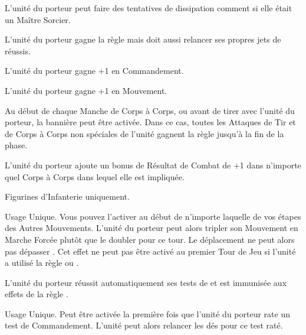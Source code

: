 L'unité du porteur peut faire des tentatives de dissipation comment si elle était un Maître Sorcier.

L'unité du porteur gagne la règle \divineattacks{} mais doit aussi relancer ses propres jets de \wardsave{} réussis.

L'unité du porteur gagne +1 en Commandement.

L'unité du porteur gagne +1 en Mouvement.

Au début de chaque Manche de Corps à Corps, ou avant de tirer avec l'unité du porteur, la bannière peut être activée. Dans ce cas, toutes les Attaques de Tir et de Corps à Corps non spéciales de l'unité gagnent la règle \flamingattacks{} jusqu'à la fin de la phase.

\columnbreak

L'unité du porteur ajoute un bonus de Résultat de Combat de +1 dans n'importe quel Corps à Corps dans lequel elle est impliquée.

Figurines d'Infanterie uniquement.

Usage Unique. Vous pouvez l'activer au début de n'importe laquelle de vos étapes des Autres Mouvements. L'unité du porteur peut alors tripler son Mouvement en Marche Forcée plutôt que le doubler pour ce tour. Le déplacement ne peut alors pas dépasser . Cet effet ne peut pas être activé au premier Tour de Jeu si l'unité a utilisé la règle \vanguard{} ou \scout{}.

L'unité du porteur réussit automatiquement ses tests de \terror{} et est immunisée aux effets de la règle \fear{}.

Usage Unique. Peut être activée la première fois que l'unité du porteur rate un test de Commandement. L'unité peut alors relancer les dés pour ce test raté.

\endpricelist
